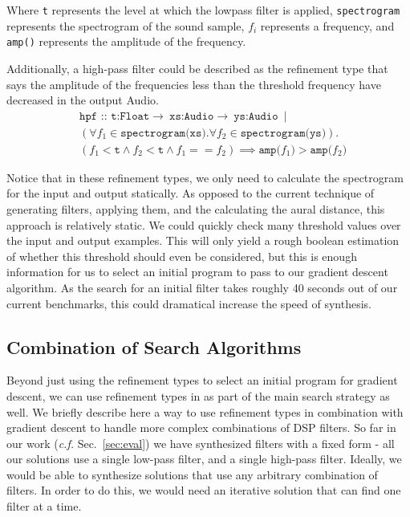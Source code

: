 Where \texttt{t} represents the level at which the lowpass filter is applied, \texttt{spectrogram} represents the spectrogram of the sound sample, $f_i$ represents a frequency, and \texttt{amp()} represents the amplitude of the frequency. 

Additionally, a high-pass filter could be described as the refinement type that says the amplitude of the frequencies less than the threshold frequency have decreased in the output Audio.
%
\begin{align*}
  &\texttt{hpf :: t:Float} \to\ \texttt{xs:Audio} \to\ \texttt{ys:Audio}\ \mid \\
  &(\forall f_1 \in \texttt{spectrogram(xs)}. \forall f_2 \in \texttt{spectrogram(ys)}). \\
  &(f_1 < \texttt{t} \land f_2 < \texttt{t} \land f_1 == f_2) \implies \texttt{amp(}f_1\texttt{)} > \texttt{amp(} f_2 \texttt{)} 
\end{align*}

Notice that in these refinement types, we only need to calculate the spectrogram for the input and output statically.
As opposed to the current technique of generating filters, applying them, and the calculating the aural distance, this approach is relatively static.
We could quickly check many threshold values over the input and output examples.
This will only yield a rough boolean estimation of whether this threshold should even be considered, but this is enough information for us to select an initial program to pass to our gradient descent algorithm.
As the search for an initial filter takes roughly 40 seconds out of our current benchmarks, this could dramatical increase the speed of synthesis.

\subsection{Combination of Search Algorithms}

Beyond just using the refinement types to select an initial program for gradient descent, we can use refinement types in as part of the main search strategy as well.
We briefly describe here a way to use refinement types in combination with gradient descent to handle more complex combinations of DSP filters.
So far in our work (\textit{c.f.} Sec.~\ref{sec:eval}) we have synthesized filters with a fixed form - all our solutions use a single low-pass filter, and a single high-pass filter.
Ideally, we would be able to synthesize solutions that use any arbitrary combination of filters.
In order to do this, we would need an iterative solution that can find one filter at a time.

